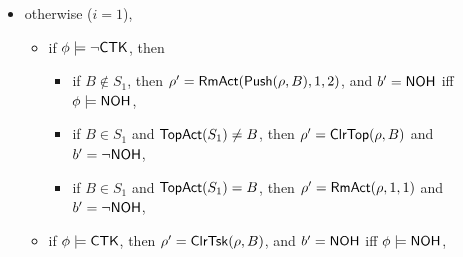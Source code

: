 {\begin{itemize}
\begin{itemize}
\begin{itemize}
\begin{itemize}
\begin{itemize}
				\end{itemize}
            			\item if $\phi \models \ctkflag$, then $\rho'= \rmact(\clrtsk(\mvtsktop(\rho, i), B), 2, 1)$, and $b' = \nohflag$ iff $\phi  \models \nohflag$, 
        			\end{itemize}
		\item otherwise ($i = 1$), 
        			\begin{itemize}
            			\item if $\phi \models \neg {\sf CTK}$, then 
            			\begin{itemize}
					\item if $B \not \in S_1$, then $\rho' = \mathsf{RmAct}(\mathsf{Push}(\rho, B), 1, 2)$, and $b' = \nohflag$ iff $\phi  \models \nohflag$, 
            				\item if $B \in S_1$ and $\mathsf{TopAct}(S_1) \neq B$, then $\rho'= \mathsf{ClrTop}(\rho, B)$ and $b' = \neg{\sf NOH}$,
					\item if $B \in S_1$ and $\mathsf{TopAct}(S_1) = B$, then $\rho' = \mathsf{RmAct}(\rho, 1, 1)$ and $b' = \neg{\sf NOH}$,
			 	\end{itemize}
            			\item if $\phi \models \ctkflag$, then $\rho'= \mathsf{ClrTsk}(\rho, B)$, and $b' = \nohflag$ iff $\phi  \models \nohflag$, 

\end{itemize}
\end{itemize}
\end{itemize}
\end{itemize}}

